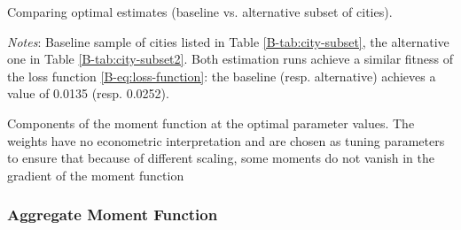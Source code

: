 \documentclass[11pt]{report}
\newcommand{\round}{revision3}  %
\newcommand{\modplots}{../../output/model/plots/\round}
\newcommand{\modtables}{../../output/model/tables}
\newcommand{\greenie}[1]{\textcolor[rgb]{0,0.71,0.35}{#1}}
\newcommand{\ptwo}{0.5}  %
\begin{document}

\begin{table}[h!]
\begin{center}
	
	\caption{Comparing optimal estimates (baseline vs. alternative subset of cities).\label{B-tab:city-subset3}}
\end{center}
{\footnotesize \textit{Notes}: Baseline sample of cities listed in Table \ref{B-tab:city-subset}, the alternative one in Table \ref{B-tab:city-subset2}. Both estimation runs achieve a similar fitness of the loss function \eqref{B-eq:loss-function}: the baseline (resp. alternative) achieves a value of 0.0135 (resp. 0.0252).}
\end{table}


\begin{table}[h!]
	\centering
	
	\caption{Components of the moment function at the optimal parameter values. The weights have no econometric interpretation and are chosen as tuning parameters to ensure that because of different scaling, some moments do not vanish in the gradient of the moment function\label{B-tab:moments}}
\end{table}



\subsubsection{Aggregate Moment Function}\label{B-sec:moment-function}
\end{document}
